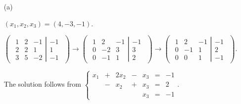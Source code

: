 \begin{Exercise}
\begin{enumerate}[(a)]
\item[(a)]
\begin{answer}
$(x_1,x_2,x_3) = (4,-3,-1)$.
\end{answer}
\begin{solution}
$\begin{pmatrix} \left.\begin{matrix}
1 & 2 & -1 \\
2 & 2 & 1 \\
3 & 5 & -2
\end{matrix} \right| \begin{matrix}
-1 \\
1 \\
-1
\end{matrix} \end{pmatrix} \longrightarrow \begin{pmatrix} \left.\begin{matrix}
1 & 2 & -1 \\
0 & -2 & 3 \\
0 & -1 & 1
\end{matrix} \right| \begin{matrix}
-1 \\
3 \\
2
\end{matrix} \end{pmatrix} \longrightarrow \begin{pmatrix} \left.\begin{matrix}
1 & 2 & -1 \\
0 & -1 & 1 \\
0 & 0 & 1
\end{matrix} \right| \begin{matrix}
-1 \\
2 \\
-1
\end{matrix} \end{pmatrix}$. 

The solution follows from
$\left\{\begin{array}{rrrrrrrr}
x_1 &+&2x_2&-&x_3 &=& -1 \\
&-&x_2&+&x_3 &=& 2 \\
& & & &x_3 &=& -1
\end{array}\right.$. 
\end{solution}


\end{enumerate}
\end{Exercise}
